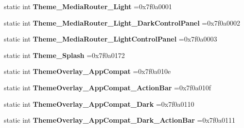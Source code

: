 \begin{DoxyCompactItemize}
static int {\bfseries Theme\+\_\+\+Media\+Router\+\_\+\+Light} =0x7f0a0001
\item 
\mbox{\label{classandroid_1_1support_1_1v7_1_1mediarouter_1_1R_1_1style_a8d612707422e97855d82a8409b44d1d9}} 
static int {\bfseries Theme\+\_\+\+Media\+Router\+\_\+\+Light\+\_\+\+Dark\+Control\+Panel} =0x7f0a0002
\item 
\mbox{\label{classandroid_1_1support_1_1v7_1_1mediarouter_1_1R_1_1style_a99e2ad3038c36fd35f9af542724df61a}} 
static int {\bfseries Theme\+\_\+\+Media\+Router\+\_\+\+Light\+Control\+Panel} =0x7f0a0003
\item 
\mbox{\label{classandroid_1_1support_1_1v7_1_1mediarouter_1_1R_1_1style_af4951bcd09c7ba4e61370a4c5c8b292f}} 
static int {\bfseries Theme\+\_\+\+Splash} =0x7f0a0172
\item 
\mbox{\label{classandroid_1_1support_1_1v7_1_1mediarouter_1_1R_1_1style_a2a00cb6c0b8192dd9944c8011a0778df}} 
static int {\bfseries Theme\+Overlay\+\_\+\+App\+Compat} =0x7f0a010e
\item 
\mbox{\label{classandroid_1_1support_1_1v7_1_1mediarouter_1_1R_1_1style_a471d5d0ac8f14cf2acb4da9b92dd07f2}} 
static int {\bfseries Theme\+Overlay\+\_\+\+App\+Compat\+\_\+\+Action\+Bar} =0x7f0a010f
\item 
\mbox{\label{classandroid_1_1support_1_1v7_1_1mediarouter_1_1R_1_1style_a60687ac9b0c3d9f2f981145a6f906e93}} 
static int {\bfseries Theme\+Overlay\+\_\+\+App\+Compat\+\_\+\+Dark} =0x7f0a0110
\item 
\mbox{\label{classandroid_1_1support_1_1v7_1_1mediarouter_1_1R_1_1style_a45d5503f9f4c3193f17dfbc36c072562}} 
static int {\bfseries Theme\+Overlay\+\_\+\+App\+Compat\+\_\+\+Dark\+\_\+\+Action\+Bar} =0x7f0a0111
\item 
\mbox{\label{classandroid_1_1support_1_1v7_1_1mediarouter_1_1R_1_1style_ad83d1819eea009e406e6e4cc8c74ffab}} 

\end{DoxyCompactItemize}
